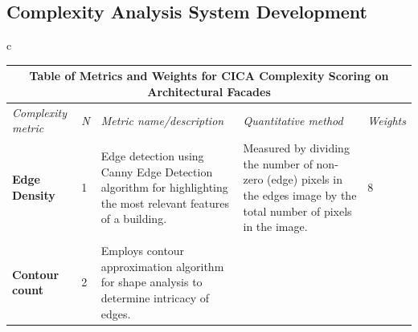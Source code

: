 \begin{linenumbers}
    \subsection{Complexity Analysis System Development}
    \label{subsec:ComplexitySystemDevelopment}
    

    \begin{table}[htb]
    \centering
    \small
    \begin{tabular}{c}
        \begin{minipage}{\textwidth}
            \centering
            \label{tab:MetricsandWeights}
            \begin{tabularx}{\textwidth}{p{2.5cm} p{1cm} X X p{1cm}}
                \toprule
                \multicolumn{5}{c}{\textbf{Table of Metrics and Weights for CICA Complexity Scoring on Architectural Facades}} \\
                \toprule
                \textit{Complexity metric} &
                  \textit{N} &
                  \textit{Metric name/description} &
                  \textit{Quantitative   method} &
                  \textit{Weights} \\ \midrule
                \textbf{Edge Density} &
                  1 &
                  Edge detection using Canny Edge Detection algorithm for highlighting the most relevant features of a building.
                    &
                  Measured by dividing the number of non-zero (edge) pixels in the edges image by the total number of pixels in the image.
                    &
                  8\\
                \\
                \textbf{Contour count} &
                  2 &
                  Employs contour approximation algorithm for shape analysis to determine intricacy of edges.

\end{tabularx}
\end{minipage}
\end{tabular}
\end{table}
\end{linenumbers}
